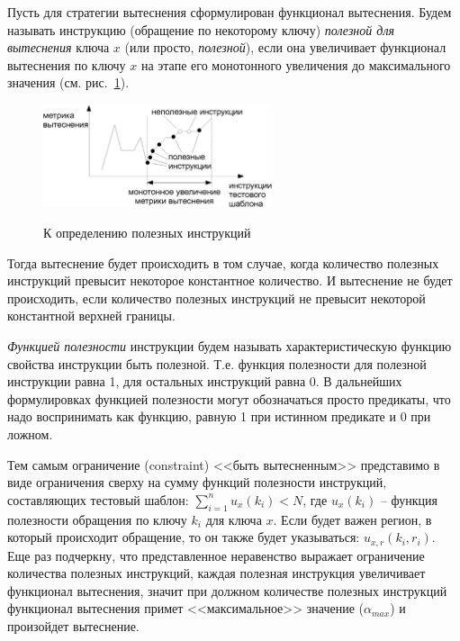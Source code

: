 Пусть для стратегии вытеснения сформулирован функционал вытеснения. Будем называть
инструкцию (обращение по некоторому ключу) \emph{полезной для вытеснения} ключа
$x$ (или просто, \emph{полезной}), если она увеличивает функционал вытеснения по
ключу $x$ на этапе его монотонного увеличения до максимального значения (см.
рис.~\ref{useful}).

\begin{figure}[h] \center
  \includegraphics[width=0.6\textwidth]{2.theor/useful}\\
  \caption{К определению полезных инструкций}\label{useful}
\end{figure}

Тогда вытеснение будет происходить в том случае, когда количество
полезных инструкций превысит некоторое константное количество.
И вытеснение не будет происходить, если количество полезных инструкций
не превысит некоторой константной верхней границы.

\emph{Функцией полезности} инструкции будем называть характеристическую функцию
свойства инструкции быть полезной. Т.е. функция полезности для полезной
инструкции равна 1, для остальных инструкций равна 0. В дальнейших формулировках
функцией полезности могут обозначаться просто предикаты, что надо воспринимать
как функцию, равную 1 при истинном предикате и 0 при ложном.

Тем самым ограничение (constraint) <<быть вытесненным>> представимо в виде
ограничения сверху на сумму функций полезности инструкций, составляющих тестовый
шаблон: $\sum_{i=1}^n u_x(k_i) < N$, где $u_x(k_i)$ -- функция полезности
обращения по ключу $k_i$ для ключа $x$. Если будет важен регион, в который
происходит обращение, то он также будет указываться: $u_{x,r}(k_i, r_i)$. Еще
раз подчеркну, что представленное неравенство выражает ограничение количества
полезных инструкций, каждая полезная инструкция увеличивает функционал вытеснения,
значит при должном количестве полезных инструкций функционал вытеснения примет
<<максимальное>> значение ($\alpha_{max}$) и произойдет вытеснение.

